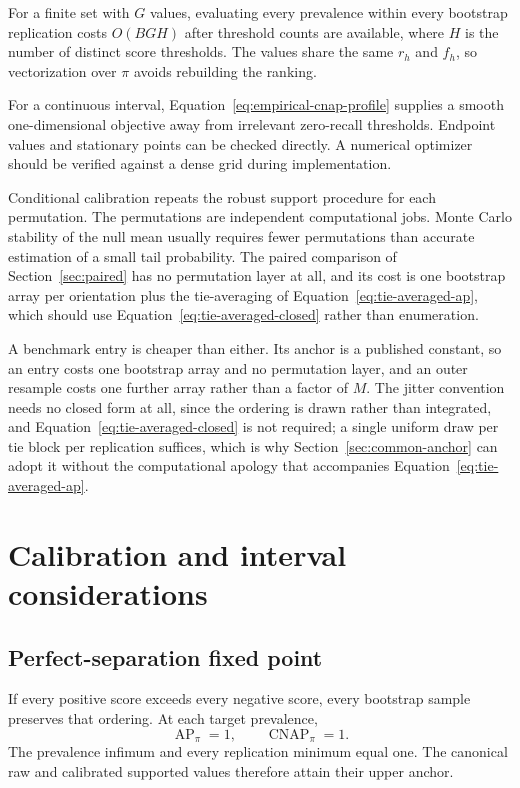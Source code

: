 \documentclass[11pt]{article}
\newcommand{\AP}{\operatorname{AP}}
\newcommand{\CNAP}{\operatorname{CNAP}}
\theoremstyle{remark}
\begin{document}
For a finite set with $G$ values, evaluating every prevalence within every bootstrap replication costs $O(BGH)$ after threshold counts are available, where $H$ is the number of distinct score thresholds. The values share the same $r_h$ and $f_h$, so vectorization over $\pi$ avoids rebuilding the ranking.

For a continuous interval, Equation~\eqref{eq:empirical-cnap-profile} supplies a smooth one-dimensional objective away from irrelevant zero-recall thresholds. Endpoint values and stationary points can be checked directly. A numerical optimizer should be verified against a dense grid during implementation.

Conditional calibration repeats the robust support procedure for each permutation. The permutations are independent computational jobs. Monte Carlo stability of the null mean usually requires fewer permutations than accurate estimation of a small tail probability. The paired comparison of Section~\ref{sec:paired} has no permutation layer at all, and its cost is one bootstrap array per orientation plus the tie-averaging of Equation~\eqref{eq:tie-averaged-ap}, which should use Equation~\eqref{eq:tie-averaged-closed} rather than enumeration.

A benchmark entry is cheaper than either. Its anchor is a published constant, so an entry costs one bootstrap array and no permutation layer, and an outer resample costs one further array rather than a factor of $M$. The jitter convention needs no closed form at all, since the ordering is drawn rather than integrated, and Equation~\eqref{eq:tie-averaged-closed} is not required; a single uniform draw per tie block per replication suffices, which is why Section~\ref{sec:common-anchor} can adopt it without the computational apology that accompanies Equation~\eqref{eq:tie-averaged-ap}.

\section{Calibration and interval considerations}
\label{app:calibration}

\subsection{Perfect-separation fixed point}

If every positive score exceeds every negative score, every bootstrap sample preserves that ordering. At each target prevalence,
\[
\AP_\pi=1,
\qquad
\CNAP_\pi=1.
\]
The prevalence infimum and every replication minimum equal one. The canonical raw and calibrated supported values therefore attain their upper anchor.
\end{document}
